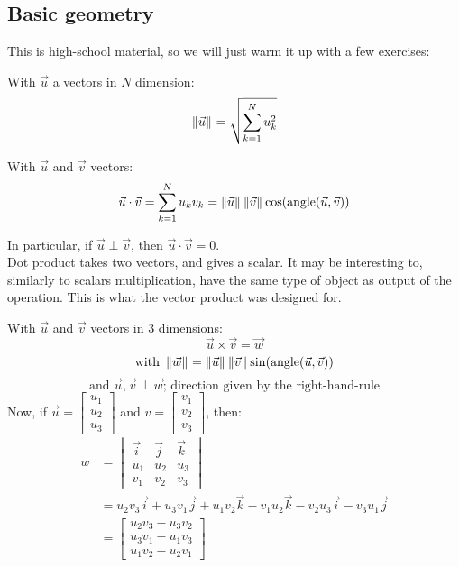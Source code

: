 \subsection{Basic geometry}
This is high-school material, so we will just warm it up with a few exercises:
\begin{definition}[Norm]
    With $\vec{u}$ a vectors in $N$ dimension:
    $$\left\lVert \vec{u} \right\rVert_{} = \sqrt{\sum_{k=1}^{N} u_k^2}$$
\end{definition}
\begin{definition}
    With $\vec{u}$ and $\vec{v}$ vectors:
    $$\vec{u} \cdot \vec{v} = \sum_{k=1}^{N} u_kv_k = \left\lVert \vec{u} \right\rVert_{}\left\lVert \vec{v} \right\rVert_{}\cos(\text{angle}(\vec{u},\vec{v}))$$
\end{definition}
In particular, if $\vec{u} \perp \vec{v}$, then $\vec{u} \cdot \vec{v} = 0$.\\
Dot product takes two vectors, and gives a scalar.
It may be interesting to, similarly to scalars multiplication, have the same type of object as output of the operation.
This is what the vector product was designed for.
\begin{definition}
    With $\vec{u}$ and $\vec{v}$ vectors in $3$ dimensions:
    $$\vec{u} \times \vec{v} = \vec{w}$$
    $$\text{with } \left\lVert \vec{w} \right\rVert_{} = \left\lVert \vec{u} \right\rVert_{}\left\lVert \vec{v} \right\rVert_{}\sin(\text{angle}(\vec{u},\vec{v}))$$
    $$\text{and } \vec{u},\vec{v} \perp \vec{w} \text{; direction given by the right-hand-rule}$$
    Now, if $\vec{u} = \begin{bmatrix} u_1 \\ u_2 \\ u_3 \end{bmatrix}$ and $v = \begin{bmatrix} v_1 \\ v_2 \\ v_3 \end{bmatrix}$, then:
    \begin{align*}
        w &= \begin{vmatrix} \vec{i} & \vec{j} & \vec{k} \\ u_1 & u_2 & u_3 \\ v_1 & v_2 & v_3 \end{vmatrix} \\
        &= u_2v_3\vec{i} + u_3v_1\vec{j} + u_1v_2\vec{k} - v_1u_2\vec{k} - v_2u_3\vec{i} - v_3u_1\vec{j} \\
        &= \begin{bmatrix} u_2v_3-u_3v_2 \\ u_3v_1-u_1v_3 \\ u_1v_2-u_2v_1 \end{bmatrix}
    \end{align*}

\end{definition}

